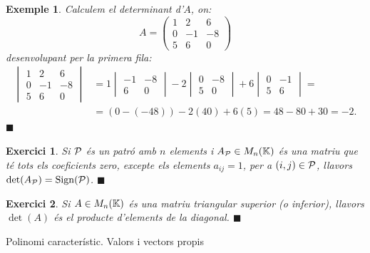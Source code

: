 \documentclass[
  11pt,
]{book}
\makeatletter
\numberwithin{dummy}{section}
\theoremstyle{maincolornumbox}
\newtheorem{exerciseT}{Exercici}[chapter]
\theoremstyle{blacknumex}
\newtheorem{exampleT}{Exemple}[chapter]
\theoremstyle{blacknumbox}
\theoremstyle{maincolornum}
\newenvironment{exercise}{\begin{eBox}\begin{exerciseT}}{\hfill{\color{maincolor}\tiny\ensuremath{\blacksquare}}\end{exerciseT}\end{eBox}}
\newenvironment{example}{\begin{exampleT}}{\hfill{\tiny\ensuremath{\blacksquare}}\end{exampleT}}
\renewcommand{\section}{\@startsection{section}{1}{\z@}
{-4ex \@plus -1ex \@minus -.4ex}
{1ex \@plus.2ex }
{\normalfont\large\sffamily\bfseries}}
\makeatother
\begin{document}
\begin{example}
Calculem el determinant d'\(A\), on:\[A=\begin{pmatrix}
    1 & 2 & 6 \\ 0 & -1 & -8 \\ 5 & 6 & 0
    \end{pmatrix}\] desenvolupant per la primera fila: \begin{align*}
    \begin{vmatrix}
    1 & 2 & 6 \\ 0 & -1 & -8 \\ 5 & 6 & 0
    \end{vmatrix} & = 1 \begin{vmatrix} -1 & -8 \\ 6 & 0 \end{vmatrix} 
    -2 \begin{vmatrix} 0 & -8 \\ 5 & 0  \end{vmatrix} +
    6 \begin{vmatrix} 0 & -1 \\ 5 & 6  \end{vmatrix} = \\
     & = (0-(-48))-2(40)+6(5)=48-80+30=-2.
\end{align*}
\end{example}

\begin{exercise}
Si \(\mathcal{P}\) és un patró amb \(n\) elements i \(A_{\mathcal{P}}\in M_n(\mathbb{K})\) és una
matriu que té tots els coeficients zero, excepte els elements
\(a_{ij}=1\), per a \((i,j)\in\mathcal{P}\), llavors \(\det(A_{\mathcal{P}})=\operatorname{Sign}(\mathcal{P})\).
\end{exercise}

\begin{exercise}
Si \(A\in M_n(\mathbb{K})\) és una matriu triangular superior (o inferior),
llavors \(\det(A)\) és el producte d'elements de la diagonal.
\end{exercise}

\section{Polinomi característic. Valors i vectors propis}\label{polinomi-caracteruxedstic.-valors-i-vectors-propis}
\end{document}
